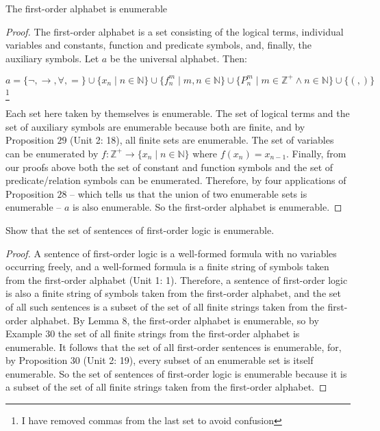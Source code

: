 \documentclass{article}
\begin{document}
\begin{lemma} The first-order alphabet is enumerable \end{lemma}
\begin{proof} The first-order alphabet is a set consisting of the logical terms, individual variables and constants, function and predicate symbols, and, finally, the auxiliary symbols. Let $a$ be the universal alphabet. Then: \begin{center} $a = \{ \neg, \rightarrow, \forall, =\} \cup \{x_n \mid n \in \mathbb{N}\} \cup \{f_n^m \mid m,n \in \mathbb{N}\} \cup \{ P_n^m \mid m \in \mathbb{Z^+} \wedge n \in \mathbb{N} \} \cup \{(,)\}$\footnote[4]{I have removed commas from the last set to avoid confusion} \end{center} Each set here taken by themselves is enumerable. The set of logical terms and the set of auxiliary symbols are enumerable because both are finite, and by Proposition $29$ (Unit 2: 18), all finite sets are enumerable. The set of variables can be enumerated by $f : \mathbb{Z^+} \rightarrow \{x_n \mid n \in \mathbb{N}\} $ where $f(x_n) = x_{n - 1}$. Finally, from our proofs above both the set of constant and function symbols and the set of predicate/relation symbols can be enumerated. Therefore, by four applications of Proposition $28$ – which tells us that the union of two enumerable sets is enumerable – $a$ is also enumerable. So the first-order alphabet is enumerable.
 \end{proof} 
\begin{proposition} 
Show that the set of sentences of first-order logic is enumerable. 
\end{proposition}
\begin{proof} A sentence of first-order logic is a well-formed formula with no variables occurring freely, and a well-formed formula is a finite string of symbols taken from the first-order alphabet (Unit 1: 1). Therefore, a sentence of first-order logic is also a finite string of symbols taken from the first-order alphabet, and the set of all such sentences is a subset of the set of all finite strings taken from the first-order alphabet. By Lemma 8, the first-order alphabet is enumerable, so by Example $30$ the set of all finite strings from the first-order alphabet is enumerable. It follows that the set of all first-order sentences is enumerable, for, by Proposition $30$ (Unit 2: 19), every subset of an enumerable set is itself enumerable. So the set of sentences of first-order logic is enumerable because it is a subset of the set of all finite strings taken from the first-order alphabet. 
\end{proof}
\end{document}
